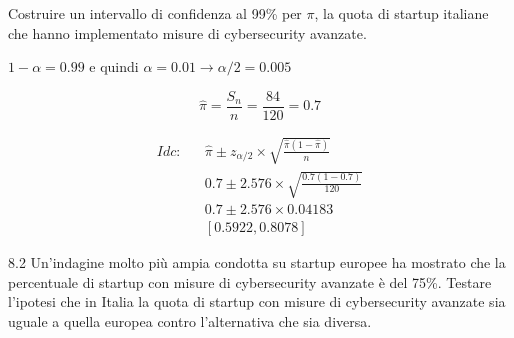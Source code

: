 \documentclass[
  11pt,
]{book}
\theoremstyle{mytheoremstyle}
\theoremstyle{mydefstyle}
\newenvironment{sol}
  {
  \begin{tcolorbox}[enhanced,breakable,arc=0.1mm,boxrule=1pt,colback=white,colframe=iblue,
  title=\bf \fontfamily{lmss}\selectfont \hspace{.5 cm} Soluzione,drop fuzzy shadow]

}{
\end{tcolorbox}
  }
\begin{document}
Costruire un intervallo di confidenza al 99\% per \(\pi\), la quota di startup italiane che hanno implementato misure di cybersecurity avanzate.

\begin{sol}
\(1-\alpha =0.99\) e quindi \(\alpha=0.01\rightarrow \alpha/2=0.005\)

\[
  \hat\pi = \frac{S_n}n = \frac{ 84 }{ 120 }= 0.7 
\]

\begin{eqnarray*}
  Idc: & &  \hat\pi \pm  z_{\alpha/2} \times \sqrt{\frac{\hat\pi(1-\hat\pi)}{n}} \\
     & &  0.7 \pm  2.576 \times \sqrt{\frac{ 0.7 (1- 0.7 )}{ 120 }} \\
     & &  0.7 \pm  2.576 \times  0.04183 \\
     & & [ 0.5922 ,  0.8078 ]
\end{eqnarray*}

\end{sol}

8.2 Un'indagine molto più ampia condotta su startup europee ha mostrato che la percentuale di startup con misure di cybersecurity avanzate è del 75\%. Testare l'ipotesi che in Italia la quota di startup con misure di cybersecurity avanzate sia uguale a quella europea contro l'alternativa che sia diversa.
\end{document}
